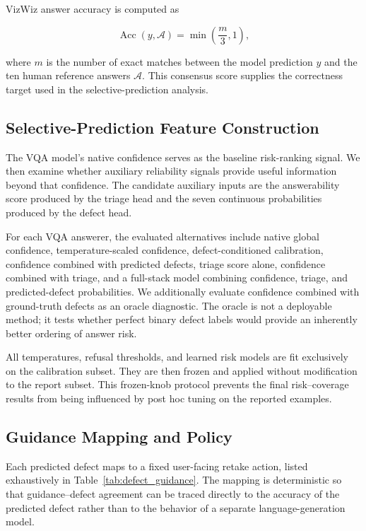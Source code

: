 \documentclass{ieeeaccess}
\begin{document}
VizWiz answer accuracy is computed as

\begin{equation}
    \operatorname{Acc}(y,\mathcal{A})
    =
    \min\left(\frac{m}{3},1\right),
    \label{eq:vizwiz_accuracy}
\end{equation}

where \(m\) is the number of exact matches between the model
prediction \(y\) and the ten human reference answers
\(\mathcal{A}\). This consensus score supplies the correctness
target used in the selective-prediction analysis.

\subsection{Selective-Prediction Feature Construction}

The VQA model's native confidence serves as the baseline
risk-ranking signal. We then examine whether auxiliary
reliability signals provide useful information beyond that
confidence. The candidate auxiliary inputs are the answerability
score produced by the triage head and the seven continuous
probabilities produced by the defect head.

For each VQA answerer, the evaluated alternatives include native
global confidence, temperature-scaled confidence,
defect-conditioned calibration, confidence combined with
predicted defects, triage score alone, confidence combined with
triage, and a full-stack model combining confidence, triage, and
predicted-defect probabilities. We additionally evaluate
confidence combined with ground-truth defects as an oracle
diagnostic. The oracle is not a deployable method; it tests
whether perfect binary defect labels would provide an inherently
better ordering of answer risk.

All temperatures, refusal thresholds, and learned risk models are
fit exclusively on the calibration subset. They are then frozen
and applied without modification to the report subset. This
frozen-knob protocol prevents the final risk--coverage results
from being influenced by post hoc tuning on the reported
examples.

\subsection{Guidance Mapping and Policy}

Each predicted defect maps to a fixed user-facing retake action,
listed exhaustively in Table~\ref{tab:defect_guidance}. The
mapping is deterministic so that guidance--defect agreement can
be traced directly to the accuracy of the predicted defect rather
than to the behavior of a separate language-generation model.
\end{document}
